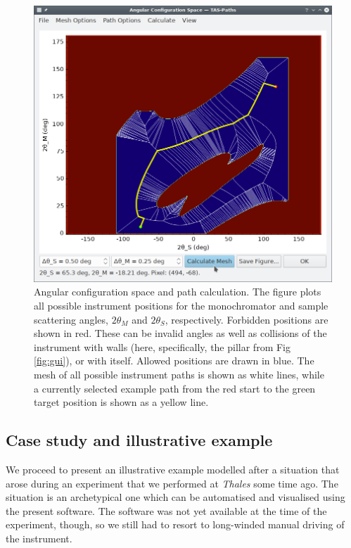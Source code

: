 \begin{figure}[htb]
		\begin{center}
			\includegraphics[width = 0.75 \textwidth]{figures/gui_configspace}
		\end{center}
	\caption[Configuration space dialog.]{Angular configuration space and path calculation.
	The figure plots all possible instrument positions for the monochromator and sample
	scattering angles, $2\theta_M$ and $2\theta_S$, respectively. Forbidden positions
	are shown in red.
	These can be invalid angles as well as collisions of the instrument with walls
	(here, specifically, the pillar from Fig \ref{fig:gui}), or with itself.
	Allowed positions are drawn in blue. The mesh of all possible instrument
	paths is shown as white lines, while a currently selected example path from
	the red start to the green target position is shown as a yellow line.
		\label{fig:gui_configspace}}
\end{figure}


\subsection{Case study and illustrative example}
We proceed to present an illustrative example modelled after a situation that arose during an 
experiment that we performed at \textit{Thales} \cite{thales} some time ago. 
The situation is an archetypical one which can be automatised and visualised using the present software. 
The software was not yet available at the time of the experiment, though, so we still had to resort 
to long-winded manual driving of the instrument.

